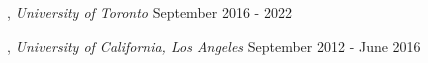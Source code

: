 
, \textit{University of Toronto}	\hfill September 2016 - 2022

, \textit{University of California, Los Angeles} \hfill	September 2012 - June 2016




